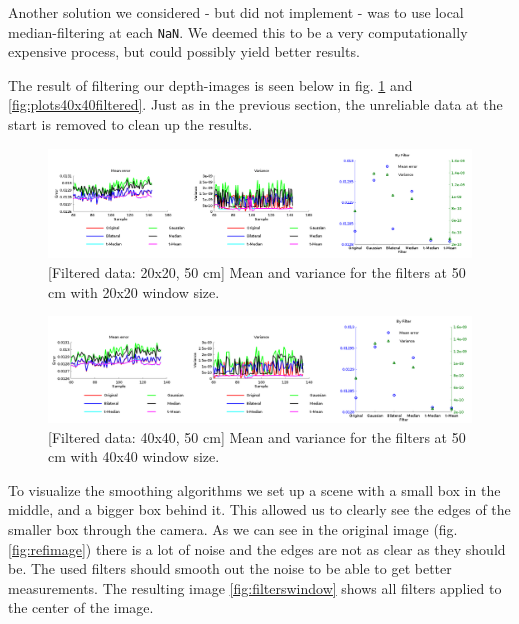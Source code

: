 \documentclass[11pt]{article}
\begin{document}
Another solution we considered - but did not implement - was to use local
median-filtering at each \texttt{NaN}. We deemed this to be a very computationally
expensive process, but could possibly yield better results. \par

The result of filtering our depth-images is seen below in
fig. \ref{fig:plots20x20filtered} and \vref{fig:plots40x40filtered}. Just as in
the previous section, the unreliable data at the start is removed to clean up
the results.

\begin{figure}[ht]
  \centering
  \includegraphics[width=1\textwidth]{figures/plot20x20filtered.png}
  [Filtered data: 20x20, 50 cm]{\label{fig:plots20x20filtered}
    Mean and variance for the filters at 50 cm with 20x20 window size.}
\end{figure}
\begin{figure}[ht]
  \begin{center}
    \includegraphics[width=1\textwidth]{figures/plot40x40filtered.png}
    [Filtered data: 40x40,
    50 cm]{\label{fig:plots40x40filtered} Mean and variance for the filters at 50
      cm with 40x40 window size.}
  \end{center}
  

\end{figure}

To visualize the smoothing algorithms we set up a scene with a small box in the middle, and a bigger box behind it. This allowed us to clearly see the edges of the smaller box through the camera. As we can see in the original
image (fig. \vref{fig:refimage}) there is a lot of noise and the edges are not as clear
as they should be. The used filters should smooth out the noise to be able to
get better measurements. The resulting image \vref{fig:filterswindow} shows all
filters applied to the center of the image. \par
\end{document}
